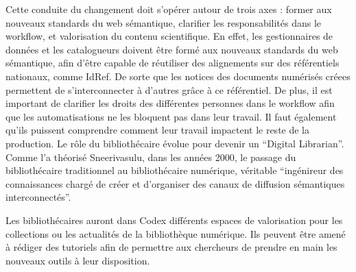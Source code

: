 Cette conduite du changement doit s'opérer autour de trois axes : former aux nouveaux standards du web sémantique, clarifier les responsabilités dans le workflow, et valorisation du contenu scientifique. En effet, les gestionnaires de données et les catalogueurs doivent être formé aux nouveaux standards du web sémantique, afin d'être capable de réutiliser des alignements sur des référentiels nationaux, comme IdRef. De sorte que les notices des documents numérisés créees permettent de s'interconnecter à d'autres grâce à ce référentiel. De plus, il est important de clarifier les droits des différentes personnes dans le workflow afin que les automatisations ne les bloquent pas dans leur travail. Il faut également qu'ils puissent comprendre comment leur travail impactent le reste de la production. Le rôle du bibliothécaire évolue pour devenir un \enquote{Digital Librarian}. Comme l'a théorisé Sneerivasulu, dans les années 2000, le passage du bibliothécaire traditionnel au bibliothécaire numérique, véritable \enquote{ingénireur des connaissances chargé de créer et d'organiser des canaux de diffusion sémantiques interconnectés}.

Les bibliothécaires auront dans Codex différents espaces de valorisation pour les collections ou les actualités de la bibliothèque numérique. Ils peuvent être amené à rédiger des tutoriels afin de permettre aux chercheurs de prendre en main les nouveaux outils à leur disposition.